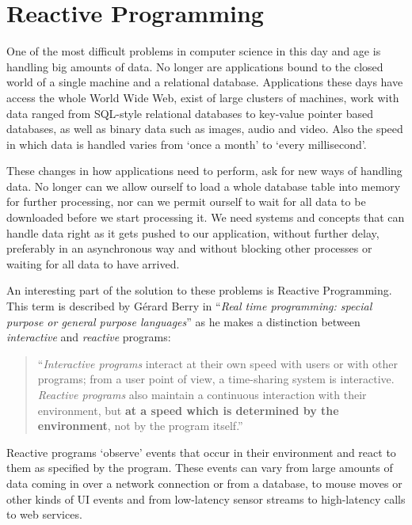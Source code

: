 \section{Reactive Programming}
\label{sec:reactive-programming}
One of the most difficult problems in computer science in this day and age is handling big amounts of data. No longer are applications bound to the closed world of a single machine and a relational database. Applications these days have access the whole World Wide Web, exist of large clusters of machines, work with data ranged from SQL-style relational databases to key-value pointer based databases, as well as binary data such as images, audio and video. Also the speed in which data is handled varies from `once a month' to `every millisecond'.

These changes in how applications need to perform, ask for new ways of handling data. No longer can we allow ourself to load a whole database table into memory for further processing, nor can we permit ourself to wait for all data to be downloaded before we start processing it. We need systems and concepts that can handle data right as it gets pushed to our application, without further delay, preferably in an asynchronous way and without blocking other processes or waiting for all data to have arrived. \cite{meijer2012-YMIAD}

An interesting part of the solution to these problems is Reactive Programming. This term is described by G\'erard Berry in ``\textit{Real time programming: special purpose or general purpose languages}'' \cite{berry1991-Reactive} as he makes a distinction between \textit{interactive} and \textit{reactive} programs:

\begin{quote}
``\textit{Interactive programs} interact at their own speed with users or with other programs; from a user point of view, a time-sharing system is interactive. \textit{Reactive programs} also maintain a continuous interaction with their environment, but \textbf{at a speed which is determined by the environment}, not by the program itself.''
\end{quote}

Reactive programs `observe' events that occur in their environment and react to them as specified by the program. These events can vary from large amounts of data coming in over a network connection or from a database, to mouse moves or other kinds of UI events and from low-latency sensor streams to high-latency calls to web services.

